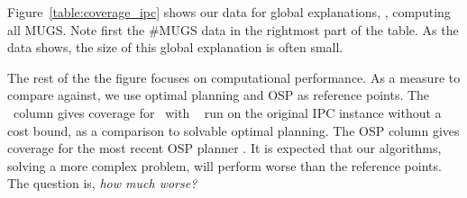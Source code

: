 \setlength{\tabcolsep}{2pt}
\renewcommand{\arraystretch}{0.8}
\begin{figure*}[h!]
\tiny
%
\centering  
%
\vspace{-0.2cm}
\caption{\label{table:coverage_ipc} Global explanation results on IPC benchmarks modified 
for oversubscription planning (OSP), with cost bounds set to $x$ times
optimal cost. Reference: \astar\ with \hlmcut\ on original task, and
OSP planning \cite{katz:etal:icaps-19}. SysS and SysW with vs.\
without conjunction learning \hc. Search tree fraction: fraction of
worst-case search tree explored. \#MUGS: average/maximum number of
MUGS, \ie, global explanation size. Best performance in each part
shown in \textbf{boldface}.}
\vspace{-0.5cm}
\end{figure*}

Figure~\ref{table:coverage_ipc} shows our data for global
explanations, \ie, computing all MUGS.
%
Note first the \#MUGS data in the rightmost part of the table. As the
data shows, the size of this global explanation is often small.
%
%
%
%

The rest of the the figure focuses on computational performance. As a
measure to compare against, we use optimal planning and OSP as
reference points. The \hlmcut\ column gives coverage for \astar\
with \hlmcut\ \cite{helmert:domshlak:icaps-09} run on the original IPC
instance without a cost bound, as a comparison to solvable optimal
planning. The OSP column gives coverage for the most recent OSP
planner \cite{katz:etal:icaps-19}.
%
It is expected that our algorithms, solving a more complex problem,
will perform worse than the reference points. The question
is, \emph{how much worse?}

